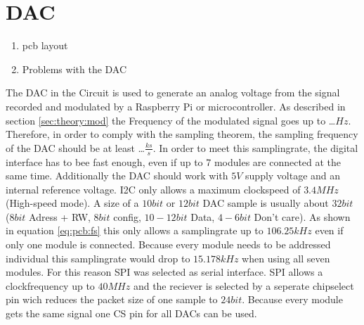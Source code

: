 \section{DAC}

\begin{enumerate}
  \item pcb layout
  \item Problems with the DAC
\end{enumerate}

The DAC in the Circuit is used to generate an analog voltage from the signal recorded and modulated by a Raspberry Pi or microcontroller.\p
%
As described in section \ref{sec:theory:mod} the Frequency of the modulated signal goes up to \dots$Hz$.
Therefore, in order to comply with the sampling theorem, the sampling frequency of the DAC should be at least \dots$\frac{ks}{s}$. In order to meet this samplingrate, the digital interface has to bee fast enough, even if up to 7 modules are connected at the same time. Additionally the DAC should work with $5V$ supply voltage and an internal reference voltage.\p
%
I2C only allows a maximum clockspeed of $3.4MHz$ (High-speed mode). A size of a $10bit$ or $12bit$ DAC sample is usually about $32bit$ ($8bit$ Adress + RW, $8bit$ config, $10 - 12bit$ Data, $4 - 6bit$ Don't care). As shown in equation \ref{eq:pcb:fs} this only allows a samplingrate up to $106.25kHz$ even if only one module is connected. Because every module needs to be addressed individual this samplingrate would drop to $15.178kHz$ when using all seven modules. For this reason SPI was selected as serial interface. SPI allows a clockfrequency up to $40MHz$ and the reciever is selected by a seperate chipselect pin wich reduces the packet size of one sample to $24bit$. Because every module gets the same signal one CS pin for all DACs can be used.\p
%
